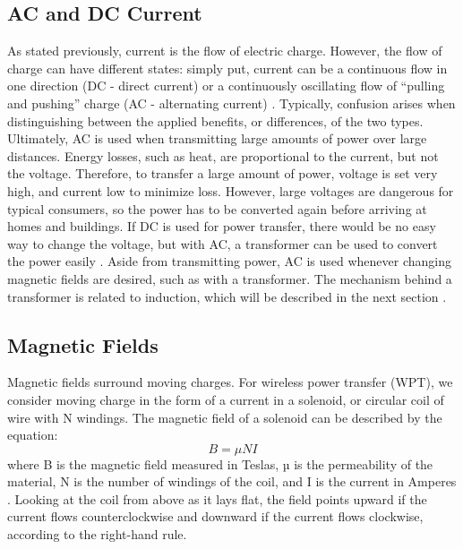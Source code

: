\subsection{AC and DC Current}
As stated previously, current is the flow of electric charge. However, the flow of charge can have different 
states: simply put, current can be a continuous flow in one direction (DC - direct current) or a continuously 
oscillating flow of “pulling and pushing” charge (AC - alternating current) \cite{young_university_2016}. 
Typically, confusion arises when distinguishing between the applied benefits, or differences, of the two types. 
Ultimately, AC is used when transmitting large amounts of power over large distances. Energy losses, such 
as heat, are proportional to the current, but not the voltage. Therefore, to transfer a large amount of power, 
voltage is set very high, and current low to minimize loss. However, large voltages are dangerous for typical 
consumers, so the power has to be converted again before arriving at homes and buildings. If DC is used for 
power transfer, there would be no easy way to change the voltage, but with AC, a transformer can be used to 
convert the power easily \cite{young_university_2016}. Aside from transmitting power, AC is used whenever changing 
magnetic fields are desired, such as with a transformer. The mechanism behind a transformer is related to induction, 
which will be described in the next section \cite{young_university_2016}.

\subsection{Magnetic Fields}
Magnetic fields surround moving charges.  For wireless power transfer (WPT), we consider moving charge in the form 
of a current in a solenoid, or circular coil of wire with N windings.  The magnetic field of a solenoid can be 
described by the equation:
\begin{equation}
    B = \mu NI
\end{equation}
where B is the magnetic field measured in Teslas, µ is the permeability of the material, N is the number of windings 
of the coil, and I is the current in Amperes \cite{young_university_2016}. Looking at the coil from above as it lays 
flat, the field points upward if the current flows counterclockwise and downward if the current flows clockwise, 
according to the right-hand rule.  

